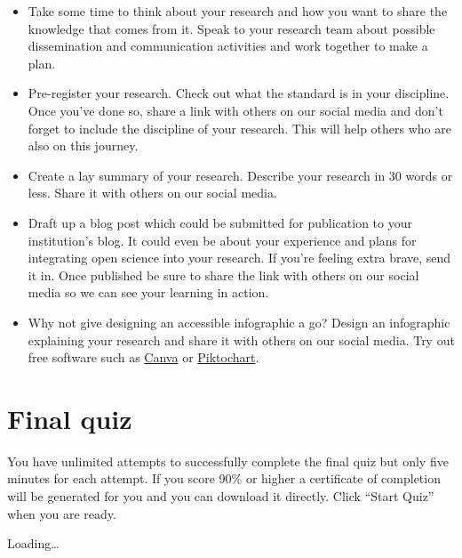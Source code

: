 \documentclass[
]{book}
\begin{document}
\begin{itemize}
\item
  Take some time to think about your research and how you want to share the knowledge that comes from it. Speak to your research team about possible dissemination and communication activities and work together to make a plan.
\item
  Pre-register your research. Check out what the standard is in your discipline. Once you've done so, share a link with others on our social media and don't forget to include the discipline of your research. This will help others who are also on this journey.
\item
  Create a lay summary of your research. Describe your research in 30 words or less. Share it with others on our social media.
\item
  Draft up a blog post which could be submitted for publication to your institution's blog. It could even be about your experience and plans for integrating open science into your research. If you're feeling extra brave, send it in. Once published be sure to share the link with others on our social media so we can see your learning in action.
\item
  Why not give designing an accessible infographic a go? Design an infographic explaining your research and share it with others on our social media. Try out free software such as \href{http://www.canva.com/}{Canva} or \href{https://piktochart.com/}{Piktochart}.
\end{itemize}

\hypertarget{final-quiz}{%
\chapter*{Final quiz}\label{final-quiz}}

You have unlimited attempts to successfully complete the final quiz but only five minutes for each attempt. If you score 90\% or higher a certificate of completion will be generated for you and you can download it directly. Click ``Start Quiz'' when you are ready.

Loading\ldots{}

  
\end{document}
